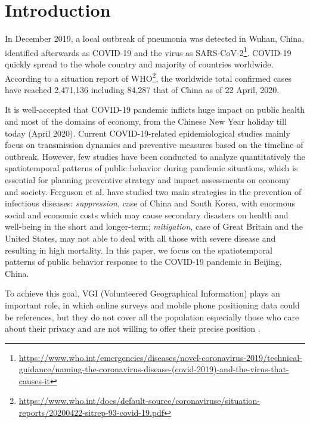 \documentclass[preprints,ijgi,submit,moreauthors]{Definitions/mdpi}
\begin{document}
\section{Introduction}
In December 2019, a local outbreak of pneumonia was detected in Wuhan, China, identified afterwards as COVID-19 and the virus as SARS-CoV-2\footnote{\url{https://www.who.int/emergencies/diseases/novel-coronavirus-2019/technical-guidance/naming-the-coronavirus-disease-(covid-2019)-and-the-virus-that-causes-it}}.
COVID-19 quickly spread to the whole country and majority of countries worldwide.
According to a situation report of WHO\footnote{\url{https://www.who.int/docs/default-source/coronaviruse/situation-reports/20200422-sitrep-93-covid-19.pdf}}, the worldwide total confirmed cases have reached 2,471,136 including 84,287 that of China as of 22 April, 2020.

It is well-accepted that COVID-19 pandemic inflicts huge impact on public health and most of the domains of economy, from the Chinese New Year holiday till today (April 2020).
Current COVID-19-related epidemiological studies mainly focus on transmission dynamics \cite{li2020early,pitzer2009demographic} and preventive measures \cite{chinazzi2020effect,van2006today} based on the timeline of outbreak.
However, few studies have been conducted to analyze quantitatively the spatiotemporal patterns of public behavior during pandemic situations, which is essential for planning preventive strategy and impact assessments on economy and society.
Ferguson et al. \cite{ferguson2020report} have studied two main strategies in the prevention of infectious diseases: \textit{suppression}, case of China and South Korea, with enormous social and economic costs which may cause secondary disasters on health and well-being in the short and longer-term;
\textit{mitigation}, case of Great Britain and the United States, may not able to deal with all those with severe disease and resulting in high mortality.
In this paper, we focus on the spatiotemporal patterns of public behavior response to the COVID-19 pandemic in Beijing, China.

To achieve this goal, VGI (Volunteered Geographical Information) plays an important role, in which online surveys and mobile phone positioning data could be references, but they do not cover all the population especially those who care about their privacy and are not willing to offer their precise position \cite{Li2016ISPRS}.  
\end{document}
